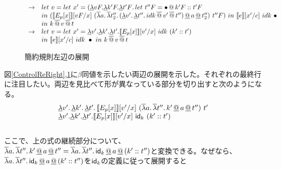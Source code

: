 \begin{figure}[h!]
\[\begin{array}{cl}

 \to & let\ v=let\ x'= (\DLamS vF.\DLamS k'F.\DLam{t'F}
                {let\ t''F=\Append{\bullet}{\Cons{k'F}{t'F}}}\\
  & in\ (
     \CPSTh{E_p[x]}[\Change{x}{vF}]\
        \SLamP{a}{\SLam{t_2''}{\DLamP{v'}{\DLam{t''}
                        {\SApp{\SApp{idk}{v'}}{t''}}} \DAppS a \DAppS t_2''}}\ t''F
        )\ in\ \CPSTh{e}[\Change{c}{x'}]\ idk\ \bullet \ \\
        & in\
        k\SAppS v \SAppS t\\


  \to & let\ v=let\ x'= \DLamS v'.\DLamS k'.\DLamS t'.

     \CPSTh{E_p[x]}[\Change{x}{v'}]\
        idk\ \ConsP{k'}{t'}\\
                    & in\ \CPSTh{e}[\Change{c}{x'}]\ idk\ \bullet \ in\
                k\SAppS v \SAppS t\\

\end{array}
\]
\caption{簡約規則左辺の展開}
\label{ControlReLeft}
\end{figure}
図\ref{ControlReRight},\ref{ControlReLeft}に$\beta$同値を示したい両辺の展開を示した。それぞれの最終行に注目したい。両辺を見比べて形が異なっている部分を切り出すと次のようになる。\\
\[
\begin{array}{l}
  \DLam{v'}{\DLam{k'}{\DLam{t'}{\CPSTh{E_p[x]}[\Change{x}{v'}]\
        \SLamP{a}{\SLam{t''}{k' \DAppS a \DAppS t''}}\ t'}}}\\
  \DLamS v'.\DLamS k'.\DLamS t'.

     \CPSTh{E_p[x]}[\Change{x}{v'}]\
     \Idk\ \ConsP{k'}{t'}\\
     
\end{array}
\]
\\
ここで、上の式の継続部分について、$\SLam{a}{\SLam{t''}{k' \DAppS a \DAppS t''}}=\SLam{a}{\SLam{t''}{\Idk \DAppS a \DAppS \ConsP{k'}{t''}}}$と変換できる。なぜなら、$\SLam{a}{\SLam{t''}{\Idk \DAppS a \DAppS \ConsP{k'}{t''}}}$を$\Idk$の定義に従って展開すると
